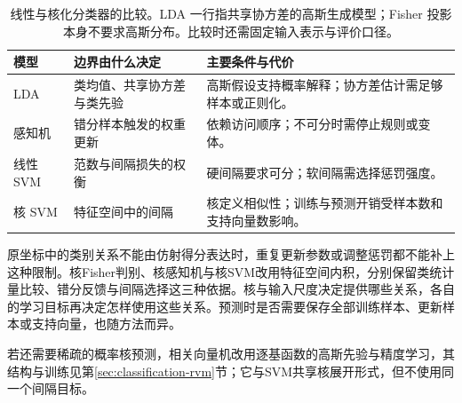 \begin{table}[htbp]
  \centering
  \small
  \begin{tabularx}{\linewidth}{@{}>{\RaggedRight\arraybackslash}p{18mm}>{\RaggedRight\arraybackslash}X>{\RaggedRight\arraybackslash}X@{}}
    \toprule
    模型 & 边界由什么决定 & 主要条件与代价 \\
    \midrule
    LDA & 类均值、共享协方差与类先验 & 高斯假设支持概率解释；协方差估计需足够样本或正则化。 \\
    感知机 & 错分样本触发的权重更新 & 依赖访问顺序；不可分时需停止规则或变体。 \\
    线性 SVM & 范数与间隔损失的权衡 & 硬间隔要求可分；软间隔需选择惩罚强度。 \\
    核 SVM & 特征空间中的间隔 & 核定义相似性；训练与预测开销受样本数和支持向量数影响。 \\
    \bottomrule
  \end{tabularx}
  \caption{线性与核化分类器的比较。LDA 一行指共享协方差的高斯生成模型；Fisher 投影本身不要求高斯分布。比较时还需固定输入表示与评价口径。}
  \label{tab:classification-linear-comparison}
\end{table}

原坐标中的类别关系不能由仿射得分表达时，重复更新参数或调整惩罚都不能补上这种限制。核Fisher判别、核感知机与核SVM改用特征空间内积，分别保留类统计量比较、错分反馈与间隔选择这三种依据。核与输入尺度决定提供哪些关系，各自的学习目标再决定怎样使用这些关系。预测时是否需要保存全部训练样本、更新样本或支持向量，也随方法而异。

若还需要稀疏的概率核预测，相关向量机改用逐基函数的高斯先验与精度学习，其结构与训练见第\ref{sec:classification-rvm}节；它与SVM共享核展开形式，但不使用同一个间隔目标。

